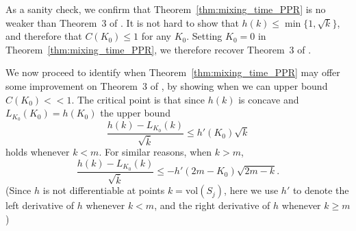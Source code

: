 \documentclass[11pt,twoside]{article}
\theoremstyle{definition}
\newcommand{\vol}{\mathrm{vol}}
\newcommand{\1}{\mathbbm{1}}
\begin{document}
As a sanity check, we confirm that Theorem~\ref{thm:mixing_time_PPR} is no weaker than Theorem~3 of \citet{andersen2006}. It is not hard to show that $h(k) \leq \min\{1,\sqrt{k}\}$, and therefore that $C(K_0) \leq 1$ for any $K_0$. Setting $K_0 = 0$ in Theorem~\ref{thm:mixing_time_PPR}, we therefore recover Theorem~3 of \citet{andersen2006}.

We now proceed to identify when Theorem~\ref{thm:mixing_time_PPR} may offer some improvement on Theorem~3 of \citet{andersen2006}, by showing when we can upper bound $C(K_0) << 1$. The critical point is that since $h(k)$ is concave and $L_{K_0}(K_0) = h(K_0)$ the upper bound
\begin{equation*}
\frac{h(k) - L_{K_0}(k)}{\sqrt{\overline{k}}} \leq h'(K_0) \sqrt{k}
\end{equation*}
holds whenever $k < m$. For similar reasons, when $k > m$, 
\begin{equation*}
\frac{h(k) - L_{K_0}(k)}{\sqrt{\overline{k}}} \leq -h'(2m - K_0) \sqrt{2m - k}.
\end{equation*} 
(Since $h$ is not differentiable at points $k = \vol(S_j)$, here we use $h'$ to denote the left derivative of $h$ whenever $k < m$, and the right derivative of $h$ whenever $k \geq m$)  
\end{document}
